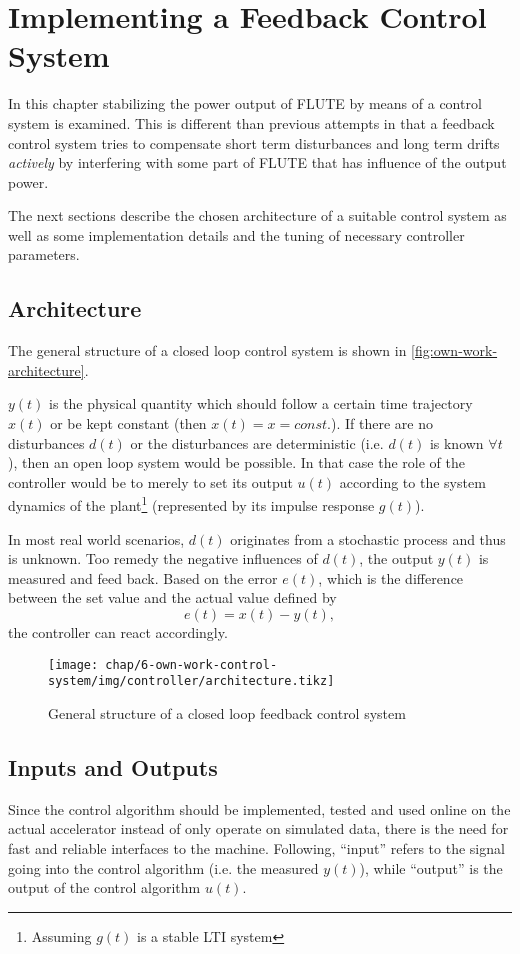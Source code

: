\chapter{Implementing a Feedback Control System}
In this chapter stabilizing the power output of FLUTE by means of a control system is examined. This is different than previous attempts in that a feedback control system tries to compensate short term disturbances and long term drifts \textit{actively} by interfering with some part of FLUTE that has influence of the output power.

The next sections describe the chosen architecture of a suitable control system as well as some implementation details and the tuning of necessary controller parameters.

\section{Architecture}
The general structure of a closed loop control system is shown in \autoref{fig:own-work-architecture}.

$y(t)$ is the physical quantity which should follow a certain time trajectory $x(t)$ or be kept constant (then $x(t)=x=const.$). If there are no disturbances $d(t)$ or the disturbances are deterministic (i.e. $d(t)$ is known $\forall t$), then an open loop system would be possible. In that case the role of the controller would be to merely to set its output $u(t)$ according to the system dynamics of the plant\footnote{Assuming $g(t)$ is a stable LTI system} (represented by its impulse response $g(t)$).

In most real world scenarios, $d(t)$ originates from a stochastic process and thus is unknown. Too remedy the negative influences of $d(t)$, the output $y(t)$ is measured and feed back. Based on the error $e(t)$, which is the difference between the set value and the actual value defined by
\begin{equation}
e(t) = x(t) - y(t),
\end{equation}
the controller can react accordingly.

\begin{figure}[tb]
	\centering
	\texttt{[image: chap/6-own-work-control-system/img/controller/architecture.tikz]}
	\caption{General structure of a closed loop feedback control system}
	\label{fig:own-work-architecture}
\end{figure}


\section{Inputs and Outputs}
Since the control algorithm should be implemented, tested and used online on the actual accelerator instead of only operate on simulated data, there is the need for fast and reliable interfaces to the machine.
Following, ``input'' refers to the signal going into the control algorithm (i.e. the measured $y(t)$), while ``output'' is the output of the control algorithm $u(t)$.

